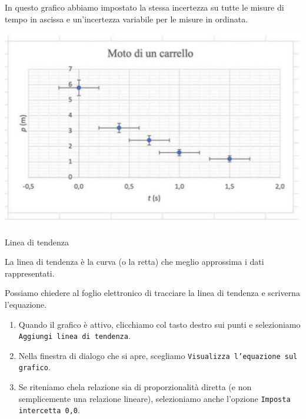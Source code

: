 \documentclass[12pt,a4paper,oneside]{book}
\makeatletter
\newcounter{testexample} %
\renewcommand{\subsubsection}{\@startsection {subsubsection}{3}{\z@}
{-2ex \@plus -0.1ex \@minus -.2ex}
{.2ex \@plus.2ex }
{\color[rgb]{0.141,0.596,0.749}\normalfont\small\sffamily\bfseries}}
\theoremstyle{esercizio}
\makeatother
\begin{document}
\begin{testexample}

    In questo grafico abbiamo impostato la stessa incertezza su tutte le misure 
    di tempo in ascissa e un'incertezza variabile per le misure in ordinata.
    
     \begin{minipage}{\linewidth}
        \centering
        \includegraphics[scale=0.3]{img/moto-carrello-libre.png} 
        \label{fig:motocarrellolibre}\end{minipage}
    \end{testexample}

\subsubsection{Linea di tendenza}

\begin{definizione}
    La linea di tendenza è la curva (o la retta) che meglio approssima i dati
    rappresentati.
\end{definizione}

Possiamo chiedere al foglio elettronico di tracciare la linea di tendenza e 
scriverna l'equazione. 
\begin{enumerate}
    \item Quando il grafico è attivo, clicchiamo col tasto destro sui punti e 
    selezioniamo \texttt{Aggiungi linea di tendenza}. 
    \item Nella finestra di dialogo che si apre, scegliamo \texttt{Visualizza l'equazione sul grafico}. 
    \item Se riteniamo chela relazione sia di proporzionalità diretta (e non 
    semplicemente una relazione lineare), selezioniamo anche l'opzione 
    \texttt{Imposta intercetta 0,0}. 
\end{enumerate}
\end{document}
